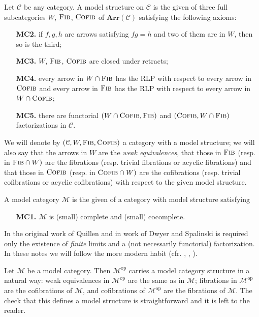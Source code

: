 \begin{refsection}
\begin{defin}
Let $\mathcal C$ be any category. A model structure on $\mathcal C$ is the given of three full subcategories $W$, $\textsc{Fib}$, $\textsc{Cofib}$ of $\mathbf{Arr}(\mathcal C)$ satisfying the following axioms:
\begin{itemize}[leftmargin = 1.4 cm]
\item[{\bfseries MC2.}] if $f,g,h$ are arrows satisfying $fg = h$ and two of them are in $W$, then so is the third;
\item[{\bfseries MC3.}] $W$, $\textsc{Fib}$, $\textsc{Cofib}$ are closed under retracts;
\item[{\bfseries MC4.}] every arrow in $W \cap \textsc{Fib}$ has the RLP with respect to every arrow in $\textsc{Cofib}$ and every arrow in $\textsc{Fib}$ has the RLP with respect to every arrow in $W \cap \textsc{Cofib}$;
\item[{\bfseries MC5.}] there are functorial $(W \cap \textsc{Cofib}, \textsc{Fib})$ and $(\textsc{Cofib}, W \cap \textsc{Fib})$ factorizations in $\mathcal C$.
\end{itemize}
We will denote by $(\mathcal C, W,\textsc{Fib},\textsc{Cofib})$ a category with a model structure; we will also say that the arrows in $W$ are the \emph{weak equivalences}, that those in $\textsc{Fib}$ (resp. in $\textsc{Fib} \cap W)$ are the fibrations (resp. trivial fibrations or acyclic fibrations) and that those in $\textsc{Cofib}$ (resp. in $\textsc{Cofib} \cap W)$ are the cofibrations (resp. trivial cofibrations or acyclic cofibrations) with respect to the given model structure.
\end{defin}

\begin{defin}
A model category $\mathcal M$ is the given of a category with model structure satisfying
\begin{itemize}[leftmargin = 1.4 cm]
\item[{\bfseries MC1.}] $\mathcal M$ is (small) complete and (small) cocomplete.
\end{itemize}
\end{defin}

\begin{rmk}
In the original work of Quillen \cite{quillen} and in work of Dwyer and Spalinski \cite{dwsp} is required only the existence of \emph{finite} limits and a (not necessarily functorial) factorization. In these notes we will follow the more modern habit (cfr. \cite{hovey}, \cite{hirschhorn}, \cite{dhk}).
\end{rmk}

\begin{eg}
Let $\mathcal M$ be a model category. Then $\mathcal M^\mathrm{op}$ carries a model category structure in a natural way: weak equivalences in $\mathcal M^\mathrm{op}$ are the same as in $\mathcal M$; fibrations in $\mathcal M^\mathrm{op}$ are the cofibrations of $\mathcal M$, and cofibrations of $\mathcal M^\mathrm{op}$ are the fibrations of $\mathcal M$. The check that this defines a model structure is straightforward and it is left to the reader.
\end{eg}


\end{refsection}
